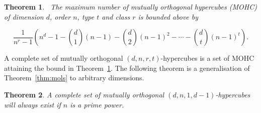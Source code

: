 \documentclass{article}
\newtheorem{theorem}{Theorem}
\begin{document}
\begin{theorem}~\label{thm:mut-ortho}
  The maximum number of mutually orthogonal hypercubes (MOHC) of dimension \(d\), order \(n\), type \(t\) and class \(r\) is bounded above by

  \begin{equation}
    \frac{1}{n^r - 1}\left(n^d - 1 - \binom{d}{1}(n - 1) - \binom{d}{2}{(n - 1)}^2 - \cdots - \binom{d}{t} {(n - 1)}^t\right). \label{eq:ortho-bound}
  \end{equation}

\end{theorem}

A complete set of mutually orthogonal \((d,n,r,t)\)-hypercubes is a set of MOHC attaining the bound in Theorem~\ref{thm:mut-ortho}. The following theorem is a generalisation of Theorem~\ref{thm:mols} to arbitrary dimensions.

\begin{theorem}\label{thm:general-ortho-proof}
  A complete set of mutually orthogonal \((d, n, 1, d - 1)\)-hypercubes will always exist if \(n\) is a prime power.
\end{theorem}
\end{document}
